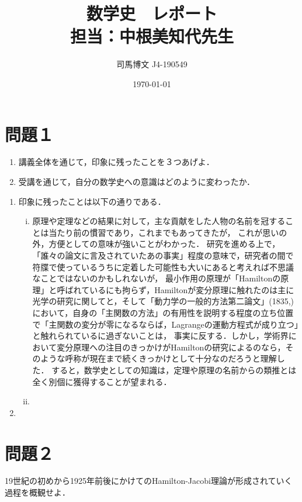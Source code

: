 \documentclass[uplatex, dvipdfmx]{jsreport}
\title{数学史　レポート\\担当：中根美知代先生}
\author{司馬博文 J4-190549}
\date{\today}
\begin{document}
\section{問題１}

\begin{tcolorbox}[colframe=ForestGreen, colback=ForestGreen!10!white,breakable,colbacktitle=ForestGreen!40!white,coltitle=black,fonttitle=\bfseries\sffamily,
title=]
    \begin{enumerate}
        \item 講義全体を通じて，印象に残ったことを３つあげよ．
        \item 受講を通じて，自分の数学史への意識はどのように変わったか．
    \end{enumerate}
\end{tcolorbox}

\begin{enumerate}
    \item 印象に残ったことは以下の通りである．
    \begin{enumerate}[(i)]
        \item 原理や定理などの結果に対して，主な貢献をした人物の名前を冠することは当たり前の慣習であり，これまでもあってきたが，
        これが思いの外，方便としての意味が強いことがわかった．
        研究を進める上で，「誰々の論文に言及されていたあの事実」程度の意味で，研究者の間で符牒で使っているうちに定着した可能性も大いにあると考えれば不思議なことではないのかもしれないが，
        最小作用の原理が「Hamiltonの原理」と呼ばれているにも拘らず，Hamiltonが変分原理に触れたのは主に光学の研究に関してと，そして「動力学の一般的方法第二論文」(1835,\cite{Hamilton35})において，自身の「主関数の方法」の有用性を説明する程度の立ち位置で「主関数の変分が零になるならば，Lagrangeの運動方程式が成り立つ」と触れられているに過ぎないことは，
        事実に反する．しかし，学術界において変分原理への注目のきっかけがHamiltonの研究によるのなら，そのような呼称が現在まで続くきっかけとして十分なのだろうと理解した．
        すると，数学史としての知識は，定理や原理の名前からの類推とは全く別個に獲得することが望まれる．
        \item 
    \end{enumerate}
    \item 
\end{enumerate}

\section{問題２}

\begin{tcolorbox}[colframe=ForestGreen, colback=ForestGreen!10!white,breakable,colbacktitle=ForestGreen!40!white,coltitle=black,fonttitle=\bfseries\sffamily,
title=]
    19世紀の初めから1925年前後にかけてのHamilton-Jacobi理論が形成されていく過程を概観せよ．
\end{tcolorbox}
\end{document}
